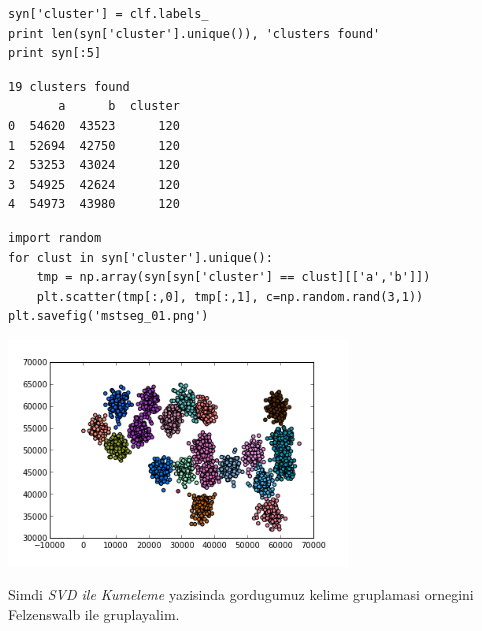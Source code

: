 \documentclass[12pt,fleqn]{article}\usepackage{../common}
\begin{document}
\begin{verbatim}
syn['cluster'] = clf.labels_
print len(syn['cluster'].unique()), 'clusters found'
print syn[:5]
\end{verbatim}

\begin{verbatim}
19 clusters found
       a      b  cluster
0  54620  43523      120
1  52694  42750      120
2  53253  43024      120
3  54925  42624      120
4  54973  43980      120
\end{verbatim}

\begin{verbatim}
import random
for clust in syn['cluster'].unique():
    tmp = np.array(syn[syn['cluster'] == clust][['a','b']])
    plt.scatter(tmp[:,0], tmp[:,1], c=np.random.rand(3,1))
plt.savefig('mstseg_01.png')
\end{verbatim}

\includegraphics[height=6cm]{mstseg_01.png}

Simdi {\em SVD ile Kumeleme} yazisinda gordugumuz kelime gruplamasi ornegini
Felzenswalb ile gruplayalim. 
\end{document}
